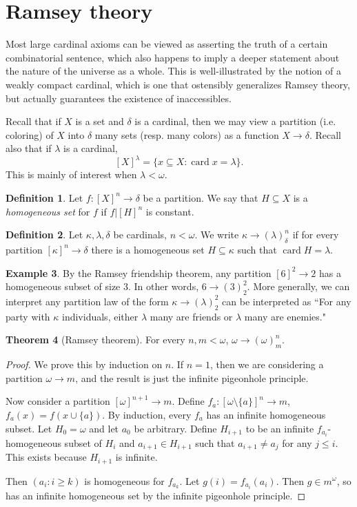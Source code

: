 \documentclass[12pt]{report}
\newcommand{\card}{\operatorname{card}}
\newcommand{\dfn}[1]{\emph{#1}\index{#1}}
\theoremstyle{definition}
\newtheorem{theorem}{Theorem}[chapter]
\newtheorem{definition}[theorem]{Definition}
\newtheorem{example}[theorem]{Example}
\begin{document}
\section{Ramsey theory}
Most large cardinal axioms can be viewed as asserting the truth of a certain combinatorial sentence, which also happens to imply a deeper statement about the nature of the universe as a whole.
This is well-illustrated by the notion of a weakly compact cardinal, which is one that ostensibly generalizes Ramsey theory, but actually guarantees the existence of inaccessibles.

Recall that if $X$ is a set and $\delta$ is a cardinal, then we may view a partition (i.e. coloring) of $X$ into $\delta$ many sets (resp. many colors) as a function $X \to \delta$.
Recall also that if $\lambda$ is a cardinal,
$$[X]^\lambda = \{x \subseteq X: \card x = \lambda\}.$$
This is mainly of interest when $\lambda < \omega$.
\begin{definition}
Let $f: [X]^n \to \delta$ be a partition. We say that $H \subseteq X$ is a \dfn{homogeneous set} for $f$ if $f|[H]^n$ is constant.
\end{definition}
\begin{definition}
Let $\kappa,\lambda,\delta$ be cardinals, $n < \omega$. We write $\kappa \to (\lambda)_\delta^n$ if for every partition $[\kappa]^n \to \delta$ there is a homogeneous set $H \subseteq \kappa$ such that $\card H = \lambda$.
\end{definition}
\begin{example}
By the Ramsey friendship theorem, any partition $[6]^2 \to 2$ has a homogeneous subset of size $3$. In other words, $6 \to (3)_2^2$.
More generally, we can interpret any partition law of the form $\kappa \to (\lambda)_2^2$ can be interpreted as
``For any party with $\kappa$ individuals, either $\lambda$ many are friends or $\lambda$ many are enemies."
\end{example}
\begin{theorem}[Ramsey theorem]
For every $n, m < \omega$, $\omega \to (\omega)^n_m$.
\end{theorem}
\begin{proof}
We prove this by induction on $n$. If $n = 1$, then we are considering a partition $\omega \to m$, and the result is just the infinite pigeonhole principle.

Now consider a partition $[\omega]^{n+1} \to m$. Define $f_a: [\omega \setminus \{a\}]^n \to m$, $f_a(x) = f(x \cup \{a\})$.
By induction, every $f_a$ has an infinite homogeneous subset. Let $H_0 = \omega$ and let $a_0$ be arbitrary.
Define $H_{i+1}$ to be an infinite $f_{a_i}$-homogeneous subset of $H_i$ and $a_{i+1} \in H_{i+1}$ such that $a_{i+1} \neq a_j$ for any $j \leq i$.
This exists because $H_{i+1}$ is infinite.

Then $(a_i: i \geq k)$ is homogeneous for $f_{a_k}$. Let $g(i) = f_{a_i}(a_i)$. Then $g \in m^\omega$, so has an infinite homogeneous set by the infinite pigeonhole principle.
\end{proof}
\end{document}
